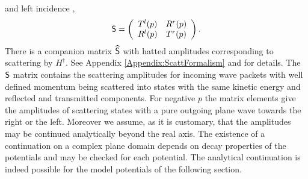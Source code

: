 and left incidence \cite{Muga2004},
%
\begin{equation}
	\sf{S}=\left(\begin{array}{cc}
	T^l(p)&R^r(p)
	\\
	R^l(p)&T^r(p)
	\end{array}\right).
\end{equation}
%
There is a companion matrix $\widehat{\sf{S}}$ with hatted amplitudes corresponding to scattering by $H^{\dagger}$. See Appendix \ref{Appendix:ScattFormalism} and \cite{Muga2004} for details. The $\sf{S}$ matrix contains the scattering amplitudes for incoming wave packets with well defined momentum being scattered into states with the same kinetic energy and reflected and transmitted components.
%
For negative $p$ the matrix elements give the amplitudes of scattering states with a pure outgoing plane wave towards the right or the left.
Moreover we assume, as it is customary,
that the amplitudes may be continued analytically beyond the real axis.
The existence of a continuation on a complex plane domain depends on decay properties of the potentials and may
be checked for each potential.
The analytical continuation is indeed possible for the model potentials of the following section.



